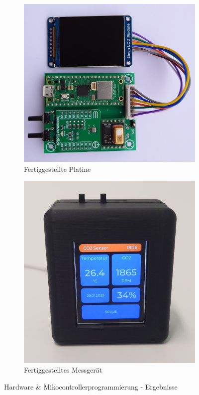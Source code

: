 \begin{inhalt}
\begin{figure}[!htb]
    \centering
    \begin{subfigure}[b]{0.49\textwidth}
        \includegraphics[width=\textwidth]{files/Tobias/pics/Platine (2).jpg}
        \caption{Fertiggestellte Platine}
        \label{fig:fertigeplatine}
    \end{subfigure}
    \hfill
    \begin{subfigure}[b]{0.49\textwidth}
        \includegraphics[width=\textwidth]{files/Tobias/pics/Geraet.jpg}
        \caption{Fertiggestelltes Messgerät}
        \label{fig:fertigesGerat}
    \end{subfigure}
    \caption[Hardware \& Mikocontrollerprogrammierung - Ergebnisse]{Hardware \& Mikocontrollerprogrammierung - Ergebnisse}
    \label{fig:Ergebnisse}
\end{figure}



\end{inhalt}
